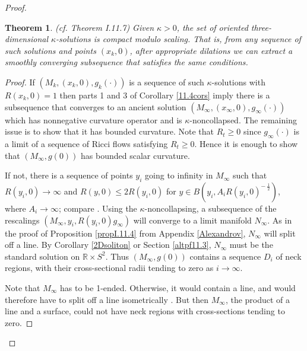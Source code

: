 \documentclass[12pt]{amsart}
\newcommand{\R}{{\mathbb R}}
\numberwithin{equation}{section}
\theoremstyle{plain}
\newtheorem{theorem}[equation]{Theorem}
\theoremstyle{definition}
\theoremstyle{remark}
\begin{document}
\begin{proof}
\begin{theorem} (cf. Theorem I.11.7) \label{thmI.11.7}
Given $\kappa > 0$, the set of oriented
three-dimensional $\kappa$-solutions is compact modulo scaling.  That is, from any
sequence of such solutions and points $(x_k, 0)$, 
after appropriate dilations 
we can extract a
smoothly converging subsequence that satisfies the same conditions.
\end{theorem}
\begin{proof}
If $(M_k, (x_k, 0), g_k(\cdot))$ is a sequence of such $\kappa$-solutions with
$R(x_k, 0) = 1$ then
parts 1 and 3 of Corollary \ref{11.4cors} imply there is a subsequence that
converges to an ancient solution $(M_\infty, (x_\infty, 0), g_\infty(\cdot))$
which has nonnegative curvature operator and is $\kappa$-noncollapsed.
The remaining issue is to show that it has bounded curvature. 
Note that $R_t\geq 0$ since $g_\infty(\cdot)$  is  a limit of a sequence
of Ricci flows satisfying $R_t\geq 0$.  
Hence it is
enough to show that $(M_\infty, g(0))$ has bounded scalar curvature.

If not, there is a sequence of points $y_i$ going to infinity in $M_\infty$
such that $R(y_i, 0) \rightarrow \infty$ and
$R(y,0) \le 2 R(y_i,0)$ for $y \in B(y_i, A_i R(y_i,0)^{- \: \frac12})$, where
$A_i \rightarrow \infty$; compare \cite[Lemma 22.2]{Hamilton}. 
Using the $\kappa$-noncollapsing, a subsequence of the rescalings
$(M_\infty, y_i, R(y_i, 0) g_\infty)$ will converge to a limit manifold
$N_\infty$.
As in the proof of Proposition \ref{propI.11.4}
from Appendix \ref{Alexandrov},
$N_\infty$ will split off a line.
By Corollary \ref{2Dsoliton} or Section \ref{altpf11.3}, 
$N_\infty$ must be the standard solution
on $\R \times S^2$. Thus $(M_\infty, g(0))$ contains a sequence
$D_i$ of neck regions, with their 
cross-sectional radii
tending to zero as
$i \rightarrow \infty$.  

Note that $M_\infty$
has to be 1-ended.  Otherwise, it would contain a line,
and would therefore have to split off a line isometrically
\cite[Theorem 8.17]{Cheeger-Ebin}.
But then $M_\infty$, the product of a line and a surface,
could not have neck regions with cross-sections tending to zero.


\end{proof}
\end{proof}
\end{document}
